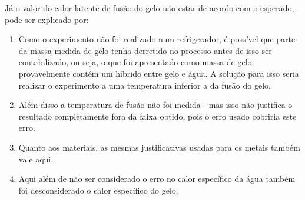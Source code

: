 \documentclass[a4paper]{article}
\begin{document}
		Já o valor do calor latente de fusão do gelo não estar de acordo com o esperado,
		pode ser explicado por:
			\begin{enumerate}
				\item Como o experimento não foi realizado num refrigerador, é possível
				que parte da massa medida de gelo tenha derretido no processo antes
				de isso ser contabilizado, ou seja, o que foi apresentado como massa
				de gelo, provavelmente contém um híbrido entre gelo e água. A solução
				para isso seria realizar o experimento a uma temperatura inferior
				a da fusão do gelo.
				\item Além disso a temperatura de fusão não foi medida - mas isso não justifica
				o resultado completamente fora da faixa obtido, pois o erro usado cobriria este
				erro.
				\item Quanto aos materiais, as mesmas justificativas usadas para os metais
				também vale aqui.
				\item Aqui além de não ser considerado o erro no calor específico da água
				também foi desconsiderado o calor específico do gelo.
			\end{enumerate}
\end{document}
